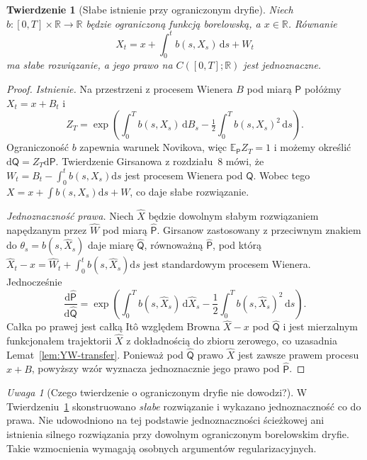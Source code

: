 \documentclass[11pt,a4paper,oneside]{report}
\numberwithin{equation}{chapter}
\theoremstyle{plain}
\newtheorem{twierdzenie}{Twierdzenie}[chapter]
\theoremstyle{definition}
\theoremstyle{remark}
\newtheorem{uwaga}{Uwaga}[chapter]
\newcommand{\R}{\mathbb{R}}
\newcommand{\E}{\mathbb{E}}
\newcommand{\dd}{\mathrm{d}}
\begin{document}
\begin{twierdzenie}[Słabe istnienie przy ograniczonym dryfie]
\label{th:bounded-borel-weak}
Niech $b:[0,T]\times\R\to\R$ będzie ograniczoną funkcją
borelowską, a $x\in\R$. Równanie
\[
 X_t=x+\int_0^t b(s,X_s)\,\dd s+W_t
 \tag{14.2}\label{eq:borel-drift}
\]
ma słabe rozwiązanie, a jego prawo na $C([0,T];\R)$
jest jednoznaczne.
\end{twierdzenie}
\begin{proof}
\emph{Istnienie.} Na przestrzeni z procesem Wienera $B$
pod miarą $\mathsf P$ połóżmy $X_t=x+B_t$ i
\[
 Z_T=\exp\left(\int_0^Tb(s,X_s)\,\dd B_s
 -\tfrac12\int_0^Tb(s,X_s)^2\,\dd s\right).
\]
Ograniczoność $b$ zapewnia warunek Novikova,
więc $\E_{\mathsf P}Z_T=1$ i możemy określić
$\dd\mathsf Q=Z_T\dd\mathsf P$.
Twierdzenie Girsanowa z rozdziału~8 mówi, że
$W_t=B_t-\int_0^tb(s,X_s)\dd s$ jest
procesem Wienera pod $\mathsf Q$.
Wobec tego $X=x+\int b(s,X_s)\dd s+W$,
co daje słabe rozwiązanie.

\emph{Jednoznaczność prawa.} Niech $\widehat X$ będzie
dowolnym słabym rozwiązaniem napędzanym przez
$\widehat W$ pod miarą $\widehat{\mathsf P}$.
Girsanow zastosowany z przeciwnym znakiem do
$\theta_s=b(s,\widehat X_s)$ daje miarę
$\widehat{\mathsf Q}$, równoważną
$\widehat{\mathsf P}$, pod którą
$\widehat X_t-x=\widehat W_t+
\int_0^tb(s,\widehat X_s)\dd s$ jest
standardowym procesem Wienera. Jednocześnie
\[
 \frac{\dd\widehat{\mathsf P}}{\dd\widehat{\mathsf Q}}
 =\exp\left(\int_0^T b(s,\widehat X_s)\,\dd\widehat X_s
 -\frac12\int_0^Tb(s,\widehat X_s)^2\,\dd s\right).
\]
Całka po prawej jest całką Itô względem Browna
$\widehat X-x$ pod $\widehat{\mathsf Q}$ i jest
mierzalnym funkcjonałem trajektorii $\widehat X$
z dokładnością do zbioru zerowego, co uzasadnia
Lemat~\ref{lem:YW-transfer}. Ponieważ pod
$\widehat{\mathsf Q}$ prawo $\widehat X$ jest zawsze
prawem procesu $x+B$, powyższy wzór wyznacza jednoznacznie
jego prawo pod $\widehat{\mathsf P}$.
\end{proof}

\begin{uwaga}[Czego twierdzenie o ograniczonym dryfie nie dowodzi?]
W Twierdzeniu~\ref{th:bounded-borel-weak} skonstruowano
\emph{słabe} rozwiązanie i wykazano jednoznaczność co do
prawa. Nie udowodniono na tej podstawie jednoznaczności
ścieżkowej ani istnienia silnego rozwiązania przy dowolnym
ograniczonym borelowskim dryfie. Takie wzmocnienia wymagają
osobnych argumentów regularizacyjnych.
\end{uwaga}
\end{document}
